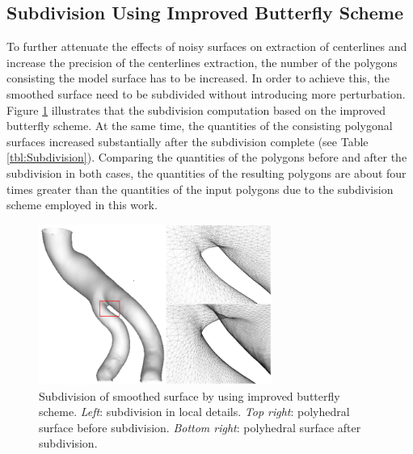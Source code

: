 \subsection{Subdivision Using Improved Butterfly Scheme}

To further attenuate the effects of noisy surfaces on extraction of centerlines and increase the precision of the centerlines extraction, the number of the polygons consisting the model surface has to be increased.
In order to achieve this, the smoothed surface need to be subdivided without introducing more perturbation.
Figure \ref{fig:SubdivisionLocal} illustrates that the subdivision computation based on the improved butterfly scheme.
At the same time, the quantities of the consisting polygonal surfaces increased substantially after the subdivision complete (see Table \ref{tbl:Subdivision}).
Comparing the quantities of the polygons before and after the subdivision in both cases, the quantities of the resulting polygons are about four times greater than the quantities of the input polygons due to the subdivision scheme employed in this work.
\begin{figure}[t]
\centering
\includegraphics[width=3.0in]{Figures/chap05/subdivision.png}
\caption{Subdivision of smoothed surface by using improved butterfly scheme. \emph{Left}: subdivision in local details. \emph{Top right}: polyhedral surface before subdivision. \emph{Bottom right}: polyhedral surface after subdivision.}%
\label{fig:SubdivisionLocal}
\end{figure}


